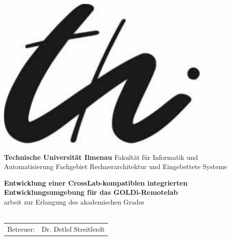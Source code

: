 
\begin{titlepage}
    \hspace{-1cm}
    \begin{minipage}{3.5cm}
        \includegraphics[width=0.8\textwidth]{images/logo}
    \end{minipage}
    \hspace{0.2cm}
    \begin{minipage}{12.5cm}
        \large
        {\bf Technische Universität Ilmenau}\newline
        Fakultät für Informatik und Automatisierung\newline
        Fachgebiet Rechnerarchitektur und Eingebettete Systeme
    \end{minipage}
    \begin{center}
        \vspace{0.8cm}
        {\Large\bfseries Entwicklung einer CrossLab-kompatiblen integrierten Entwicklungsumgebung für das GOLDi-Remotelab\\}
        \vspace{0.8cm}
        \settingsDegree arbeit zur Erlangung des akademischen Grades \settingsDegreeName\\[0.5cm]
        {\Large \bfseries \settingsName\\[1.0cm]}
        \begin{table}[ht]
            \centering
            \begin{tabular}{ll}
                Betreuer: & Dr. Detlef Streitferdt                    \\[2mm]

\end{tabular}
\end{table}
\end{center}
\end{titlepage}
